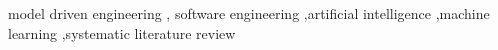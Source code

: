 \documentclass[a4paper]{cas-sc}
\begin{document}


\begin{keywords}
model driven engineering \sep 
software engineering \sep artificial intelligence \sep machine learning \sep systematic literature review
\end{keywords}


\maketitle



















\printcredits




\end{document}
